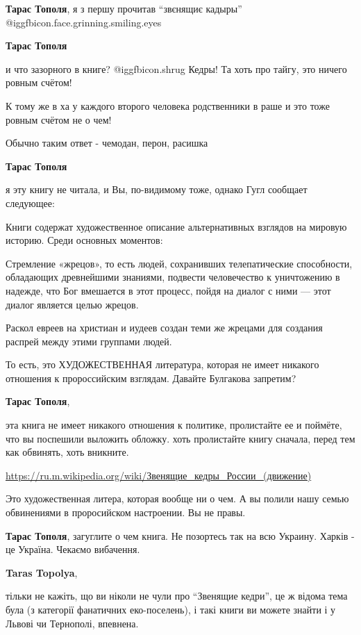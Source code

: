 \begin{itemize}
\begin{itemize}
\textbf{Тарас Тополя}, я з першу прочитав \enquote{звєнящиє кадыры}  @igg{fbicon.face.grinning.smiling.eyes} 

\textbf{Тарас Тополя} 

и что зазорного в книге?  @igg{fbicon.shrug}  Кедры! Та хоть про тайгу, это ничего ровным счётом!

К тому же в ха у каждого второго человека родственники в раше и это тоже ровным
счётом не о чем!

Обычно таким ответ - чемодан, перон, расишка

\textbf{Тарас Тополя} 

я эту книгу не читала, и Вы, по-видимому тоже, однако Гугл сообщает следующее:

Книги содержат художественное описание альтернативных взглядов на мировую
историю. Среди основных моментов:

Стремление «жрецов», то есть людей, сохранивших телепатические способности,
обладающих древнейшими знаниями, подвести человечество к уничтожению в надежде,
что Бог вмешается в этот процесс, пойдя на диалог с ними — этот диалог является
целью жрецов.

Раскол евреев на христиан и иудеев создан теми же жрецами для создания распрей
между этими группами людей.

То есть, это ХУДОЖЕСТВЕННАЯ литература, которая не имеет никакого отношения к
пророссийским взглядам. Давайте Булгакова запретим?

\textbf{Тарас Тополя}, 

эта книга не имеет никакого отношения к политике, пролистайте ее и поймёте, что
вы поспешили выложить обложку. хоть пролистайте книгу сначала, перед тем как
обвинять, хоть вникните.

\url{https://ru.m.wikipedia.org/wiki/Звенящие_кедры_России_(движение)}


Это художественная литера, которая вообще ни о чем. А вы полили нашу семью
обвинениями в проросийском настроении. Вы не правы.

\textbf{Тарас Тополя}, загуглите о чем книга. Не позортесь так на всю Украину. Харків - це Україна. Чекаємо вибачення.

\textbf{Taras Topolya}, 

тільки не кажіть, що ви ніколи не чули про \enquote{Звенящие кедри}, це ж відома тема
була (з категорії фанатичних еко-поселень), і такі книги ви можете знайти і у
Львові чи Тернополі, впевнена.


\end{itemize}
\end{itemize}
